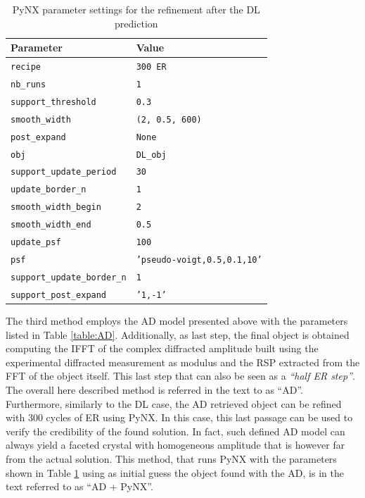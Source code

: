 \begin{table}[H] 

  \centering
  {%
    \begin{tabular}{|l|l|}
      \hline
      \textbf{Parameter} & \textbf{Value} \\
      \hline 
      \texttt{recipe}                                  & \texttt{300 ER} \\
      \texttt{nb\_runs}                                & \texttt{1} \\
      \texttt{support\_threshold}                      & \texttt{0.3} \\
      \texttt{smooth\_width}                           & \texttt{(2, 0.5, 600)} \\
      \texttt{post\_expand}                            & \texttt{None} \\
      \texttt{obj}                                     & \texttt{DL\_obj} \\
      \texttt{support\_update\_period}                 & \texttt{30} \\
      \texttt{update\_border\_n}                       & \texttt{1} \\
      \texttt{smooth\_width\_begin}                    & \texttt{2} \\
      \texttt{smooth\_width\_end}                      & \texttt{0.5} \\
      \texttt{update\_psf}                             & \texttt{100} \\
      \texttt{psf}                                     & \texttt{'pseudo-voigt,0.5,0.1,10'} \\
      \texttt{support\_update\_border\_n}              & \texttt{1} \\
      \texttt{support\_post\_expand}                   & \texttt{'1,-1'} \\
      \hline
    \end{tabular}%
  } 
  \caption{PyNX parameter settings for the refinement after the DL prediction}
  \label{table:DLpynx}
\end{table}
 
The third method employs the AD model presented above with the parameters listed in Table \ref{table:AD}. 
Additionally, as last step, the final object is obtained computing the IFFT of the complex diffracted amplitude built 
using the experimental diffracted measurement as modulus and the RSP extracted from the FFT of the object itself.
This last step that can also be seen as a \textit{``half ER step''}.\\
 The overall here described method is referred in the text to as ``AD''. 
Furthermore, similarly to the DL case, the AD retrieved object can be refined with 300 cycles of ER using PyNX. In this case, 
this last passage can be used to verify the credibility of the found solution. In fact, such defined AD model can always yield 
a faceted crystal with homogeneous amplitude that is however far from the actual solution. This method, that runs PyNX with the 
parameters shown in Table \ref{table:DLpynx} using as initial guess the object found with the AD, is in the text referred to as 
``AD + PyNX''. 


